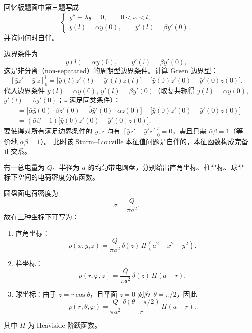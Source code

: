 \begin{question}[本征值问题的自伴性]

回忆版题面中第三题写成
\[
\begin{cases}
y''+\lambda y=0,\qquad 0<x<l,\\
y(l)=\alpha y(0),\qquad y'(l)=\beta y'(0).
\end{cases}
\]
并询问何时自伴。

\begin{solution}

边界条件为
\[
 y(l)=\alpha y(0),\qquad y'(l)=\beta y'(0),
\]
这是非分离（non-separated）的周期型边界条件。计算 Green 边界型：
\[
[\bar y z'-\bar y' z]_{0}^{l}
= \bigl[\bar y(l)z'(l)-\bar y'(l)z(l)\bigr]
- \bigl[\bar y(0)z'(0)-\bar y'(0)z(0)\bigr].
\]
代入边界条件 $y(l)=\alpha y(0)$, $y'(l)=\beta y'(0)$（取复共轭得 $\bar y(l)=\bar\alpha\bar y(0)$, $\bar y'(l)=\bar\beta\bar y'(0)$；$z$ 满足同类条件）：
\begin{align*}
&= \bigl[\bar\alpha\bar y(0)\cdot\beta z'(0)-\bar\beta\bar y'(0)\cdot\alpha z(0)\bigr]
- \bigl[\bar y(0)z'(0)-\bar y'(0)z(0)\bigr] \\
&= (\bar\alpha\beta-1)\bigl[\bar y(0)z'(0)-\bar y'(0)z(0)\bigr].
\end{align*}
要使得对所有满足边界条件的 $y,z$ 均有 $[\bar y z'-\bar y' z]_{0}^{l}=0$，需且只需 $\bar\alpha\beta = 1$（等价地 $\alpha\bar\beta = 1$）。
此时该 Sturm--Liouville 本征值问题是自伴的，本征函数构成完备正交系。


\end{solution}
\end{question}

\begin{question}[均匀带电圆盘的电荷密度]

有一总电量为 $Q$、半径为 $a$ 的均匀带电圆盘，分别给出直角坐标、柱坐标、球坐标下空间的电荷密度分布函数。

\begin{solution}

圆盘面电荷密度为
\[
\sigma=\frac{Q}{\pi a^2}.
\]
故在三种坐标下可写为：
\begin{enumerate}[label=(\arabic*),leftmargin=2.6em,itemsep=0.25em,topsep=0.2em]
\item 直角坐标：
\[
\rho(x,y,z)=\frac{Q}{\pi a^2}\,\delta(z)\,H(a^2-x^2-y^2).
\]
\item 柱坐标：
\[
\rho(r,\varphi,z)=\frac{Q}{\pi a^2}\,\delta(z)\,H(a-r).
\]
\item 球坐标：由于 $z=r\cos\theta$，且平面 $z=0$ 对应 $\theta=\pi/2$，因此
\[
\rho(r,\theta,\varphi)=\frac{Q}{\pi a^2}\,\frac{\delta(\theta-\pi/2)}{r}\,H(a-r).
\]
\end{enumerate}
其中 $H$ 为 Heaviside 阶跃函数。


\end{solution}
\end{question}

